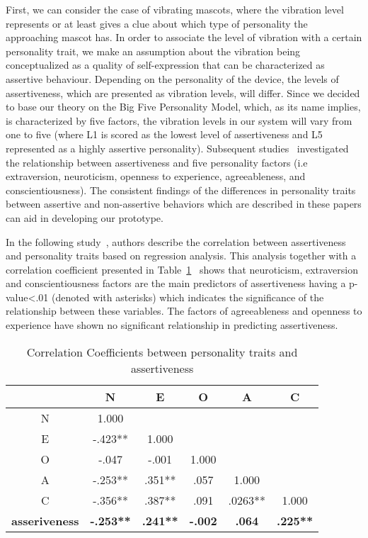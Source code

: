 First, we can consider the case of vibrating mascots, where the vibration level
represents or at least gives a clue about which type of personality the approaching mascot has.
In order to associate the level of vibration with a certain personality trait,
we make an assumption about the vibration being conceptualized as a quality of self-expression
that can be characterized as assertive behaviour.
Depending on the personality of the device, the levels of assertiveness,
which are presented as vibration levels, will differ.
Since we decided to base our theory on the Big Five Personality Model, which, as its name implies, is characterized
by five factors, the vibration levels in our system will vary from one to five (where L1 is scored
as the lowest level of assertiveness and L5 represented as a highly assertive personality).
Subsequent studies~\cite{bagherianrelationship,kirst2011investigating,ramanaiah1993neo,lefevre1981assertiveness}
investigated the relationship between assertiveness and five personality factors (i.e extraversion, neuroticism,
openness to experience, agreeableness, and conscientiousness).
The consistent findings of the differences in personality traits between assertive and
non-assertive behaviors which are described in these papers can aid in developing our prototype.

In the following study~\cite{bagherianrelationship}, authors describe the correlation between
assertiveness and personality traits based on regression analysis.
This analysis together with a correlation coefficient
presented in Table~\ref{table:assertiveness}~\cite{bagherianrelationship} shows that neuroticism,
extraversion and conscientiousness factors are the main predictors of assertiveness
having a p-value\textless .01 (denoted with asterisks) which indicates the significance of the
relationship between these variables.
The factors of agreeableness and openness to experience have shown
no significant relationship in predicting assertiveness.

\begin{table} [h]
\centering
\begin{tabular}{c c c c c c} 
\\
 \hline \hline
						& \textbf{N} 			&\textbf{E}		&\textbf{O}		&\textbf{A}		&\textbf{C}	\\ [0.5ex]
 \hline
 N 						& 1.000 				&				&				&				&	\\ 
 E 						& -.423** 			&1.000			&				&				&	\\
 O 						& -.047 			&-.001			&1.000			&				&	\\
 A 						& -.253** 			&.351**			&.057			&1.000			&	\\
 C 						& -.356** 			&.387**			&.091			&.0263**		&1.000	\\ [1ex]
 \hline
 \textbf{asseriveness}  		& \textbf{-.253**}		&\textbf{.241**}	&\textbf{-.002}		&\textbf{.064}		&\textbf{.225**}	\\
 \hline \hline
 \end{tabular}
\caption{Correlation Coefficients between personality traits and assertiveness}
 \label{table:assertiveness}
 \end{table}
 
